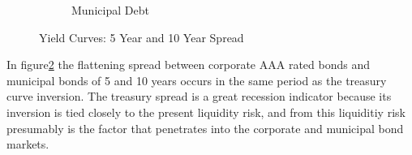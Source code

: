 \begin{figure}[H]
\begin{subfigure}{.5\textwidth}
  \caption{Municipal Debt}
  \label{fig:muni}
\end{subfigure}
\caption{Yield Curves: 5 Year and 10 Year Spread}
\label{fig:ripple}
\end{figure}

In figure\ref{fig:ripple} the flattening spread between corporate AAA rated bonds and municipal bonds of 5 and 10 years occurs in the same period as the treasury curve inversion.  The treasury spread is a great recession indicator because its inversion is tied closely to the present liquidity risk, and from this liquiditiy risk presumably is the factor that penetrates into the corporate and municipal bond markets.\cite{Gallmeyer}